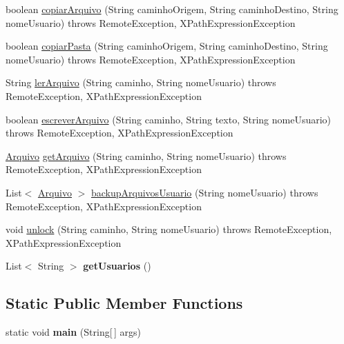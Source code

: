 \begin{DoxyCompactItemize}
\item 
boolean \hyperlink{classservidor_1_1_sistema_arquivo_abe818245ebc8bfdef68e6216b0395d50}{copiar\+Arquivo} (String caminho\+Origem, String caminho\+Destino, String nome\+Usuario)  throws Remote\+Exception, X\+Path\+Expression\+Exception 
\item 
boolean \hyperlink{classservidor_1_1_sistema_arquivo_ac33210e1f9a88aa0ac8dcfc0169838a6}{copiar\+Pasta} (String caminho\+Origem, String caminho\+Destino, String nome\+Usuario)  throws Remote\+Exception, X\+Path\+Expression\+Exception 
\item 
String \hyperlink{classservidor_1_1_sistema_arquivo_a71a3848f1d40dbcdf0625fd066435a73}{ler\+Arquivo} (String caminho, String nome\+Usuario)  throws Remote\+Exception, X\+Path\+Expression\+Exception 
\item 
boolean \hyperlink{classservidor_1_1_sistema_arquivo_a88d924eb3b3fa3cb1978478a9593e3fb}{escrever\+Arquivo} (String caminho, String texto, String nome\+Usuario)  throws Remote\+Exception, X\+Path\+Expression\+Exception 
\item 
\hyperlink{classmodel_1_1_arquivo}{Arquivo} \hyperlink{classservidor_1_1_sistema_arquivo_acdc517b4cd0f061d0f2c6ed9ea2a2911}{get\+Arquivo} (String caminho, String nome\+Usuario)  throws Remote\+Exception, X\+Path\+Expression\+Exception 
\item 
List$<$ \hyperlink{classmodel_1_1_arquivo}{Arquivo} $>$ \hyperlink{classservidor_1_1_sistema_arquivo_a73d86137128b1cd630042742cc7f9192}{backup\+Arquivos\+Usuario} (String nome\+Usuario)  throws Remote\+Exception, X\+Path\+Expression\+Exception 
\item 
void \hyperlink{classservidor_1_1_sistema_arquivo_a9665a2e279240dac472a74fe3446851d}{unlock} (String caminho, String nome\+Usuario)  throws Remote\+Exception, X\+Path\+Expression\+Exception 
\item 
\hypertarget{classservidor_1_1_sistema_arquivo_a8efeadfedc74fd9858d06c6d3be9cf8c}{List$<$ String $>$ {\bfseries get\+Usuarios} ()}\label{classservidor_1_1_sistema_arquivo_a8efeadfedc74fd9858d06c6d3be9cf8c}

\end{DoxyCompactItemize}
\subsection*{Static Public Member Functions}
\begin{DoxyCompactItemize}
\item 
\hypertarget{classservidor_1_1_sistema_arquivo_a5b4400e9b1506f105fff97d8be9d1a82}{static void {\bfseries main} (String\mbox{[}$\,$\mbox{]} args)}\label{classservidor_1_1_sistema_arquivo_a5b4400e9b1506f105fff97d8be9d1a82}

\end{DoxyCompactItemize}


